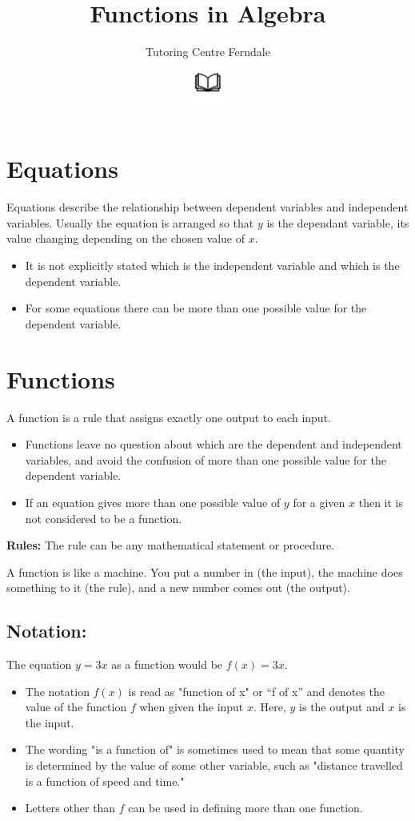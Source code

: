 \documentclass[12pt]{article}
\title{Functions in Algebra}
\author{Tutoring Centre Ferndale\\
\includegraphics[width=4em]{ApS_logo.png}}
\date{}
\begin{document}
\maketitle

\section*{Equations}
Equations describe the relationship between dependent variables and independent variables. Usually the equation is arranged so that $y$ is the dependant variable, its value changing depending on the chosen value of $x$.

\begin{itemize}
    \item It is not explicitly stated which is the independent variable and which is the dependent variable.
    \item For some equations there can be more than one possible value for the dependent variable.
\end{itemize}

\section*{Functions}
\begin{Large}
A function is a rule that assigns exactly one output to each input.
\end{Large}

\begin{itemize}
\item Functions leave no question about which are the dependent and independent variables, and avoid the confusion of more than one possible value for the dependent variable.
\item If an equation gives more than one possible value of \( y \) for a given \( x \) then it is not considered to be a function.
\end{itemize}

\textbf{Rules:} The rule can be any mathematical statement or procedure.

A function is like a machine. You put a number in (the input), the machine does something to it (the rule), and a new number comes out (the output).

\subsection*{Notation:}
The equation $y=3x$ as a function would be $f(x)=3x$.
\begin{itemize}
\item The notation $f(x)$ is read as "function of x" or “f of x” and denotes the value of the function $f$ when given the input $x$. Here, \( y \) is the output and \( x \) is the input.
\item The wording "is a function of" is sometimes used to mean that some quantity is determined by the value of some other variable, such as "distance travelled is a function of speed and time."
\item Letters other than $f$ can be used in defining more than one function.
\end{itemize}
\end{document}
